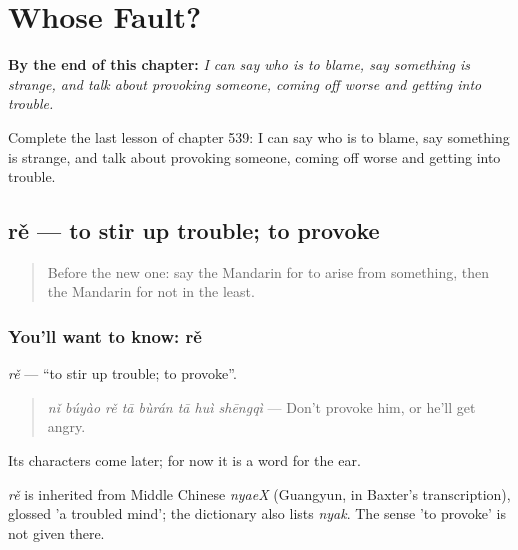 
\chapter{Whose Fault?}
\label{ch:zh-whose-fault}

\begin{chapteropening}
\textbf{By the end of this chapter:} \emph{I can say who is to blame, say something is strange, and talk about provoking someone, coming off worse and getting into trouble.}

Complete the last lesson of chapter 539: I can say who is to blame, say something is strange, and talk about provoking someone, coming off worse and getting into trouble.
\end{chapteropening}

\section[rě]{rě — to stir up trouble; to provoke}

\label{lesson:ZH-C539-re-provoke}



\begin{quote}
Before the new one: say the Mandarin for to arise from something, then the Mandarin for not in the least.
\end{quote}

\subsection*{You'll want to know: rě}
\emph{rě} — \textquotedblleft{}to stir up trouble; to provoke\textquotedblright{}.

\begin{quote}
\emph{nǐ búyào rě tā bùrán tā huì shēngqì} — Don't provoke him, or he'll get angry.
\end{quote}

Its characters come later; for now it is a word for the ear.

\begin{cousinweb}
\emph{rě} is inherited from Middle Chinese \emph{nyaeX} (Guangyun, in Baxter's transcription), glossed 'a troubled mind'; the dictionary also lists \emph{nyak}. The sense 'to provoke' is not given there.
\end{cousinweb}


